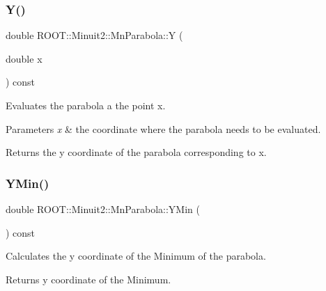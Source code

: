 \subsubsection{\texorpdfstring{Y()}{Y()}\hspace{0.1cm}{\footnotesize\ttfamily [2/2]}}
{\footnotesize\ttfamily double R\+O\+O\+T\+::\+Minuit2\+::\+Mn\+Parabola\+::Y (\begin{DoxyParamCaption}\item[{double}]{x }\end{DoxyParamCaption}) const\hspace{0.3cm}{\ttfamily [inline]}}

Evaluates the parabola a the point x.


\begin{DoxyParams}{Parameters}
{\em x} & the coordinate where the parabola needs to be evaluated.\\
\hline
\end{DoxyParams}
\begin{DoxyReturn}{Returns}
the y coordinate of the parabola corresponding to x. 
\end{DoxyReturn}
\mbox{\label{classROOT_1_1Minuit2_1_1MnParabola_a7efab0e0a9902151738605a552adef41}} 
\subsubsection{\texorpdfstring{YMin()}{YMin()}\hspace{0.1cm}{\footnotesize\ttfamily [1/2]}}
{\footnotesize\ttfamily double R\+O\+O\+T\+::\+Minuit2\+::\+Mn\+Parabola\+::\+Y\+Min (\begin{DoxyParamCaption}{ }\end{DoxyParamCaption}) const\hspace{0.3cm}{\ttfamily [inline]}}

Calculates the y coordinate of the Minimum of the parabola.

\begin{DoxyReturn}{Returns}
y coordinate of the Minimum. 
\end{DoxyReturn}
\mbox{\label{classROOT_1_1Minuit2_1_1MnParabola_a7efab0e0a9902151738605a552adef41}} 

